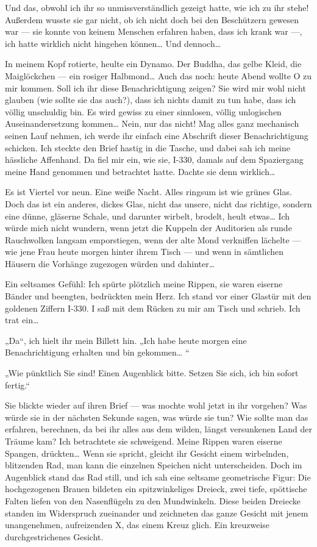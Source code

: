 Und das, obwohl ich ihr so unmissverständlich gezeigt hatte, wie
ich zu ihr stehe! Außerdem wusste sie gar nicht, ob ich nicht doch
bei den Beschützern gewesen war — sie konnte von keinem Menschen
erfahren haben, dass ich krank war —, ich hatte wirklich nicht
hingehen können\ldots{} Und dennoch\ldots{}

In meinem Kopf rotierte, heulte ein Dynamo. Der Buddha, das gelbe
Kleid, die Maiglöckchen — ein rosiger Halbmond\ldots{} Auch das noch:
heute Abend wollte O zu mir kommen. Soll ich ihr diese
Benachrichtigung zeigen? Sie wird mir wohl nicht glauben (wie
sollte sie das auch?), dass ich nichts damit zu tun habe, dass ich
völlig unschuldig bin. Es wird gewiss zu einer sinnlosen, völlig
unlogischen Auseinandersetzung kommen\ldots{} Nein, nur
das nicht! Mag alles ganz mechanisch seinen Lauf nehmen, ich werde
ihr einfach eine Abschrift dieser Benachrichtigung schicken.
Ich steckte den Brief hastig in die Tasche, und dabei sah ich meine
hässliche Affenhand. Da fiel mir ein, wie sie, I-330, damals auf
dem Spaziergang meine Hand genommen und betrachtet hatte. Dachte
sie denn wirklich\ldots{} 

Es ist Viertel vor neun. Eine weiße Nacht.
Alles ringsum ist wie grünes Glas. Doch das ist ein anderes, dickes
Glas, nicht das unsere, nicht das richtige, sondern eine dünne,
gläserne Schale, und darunter wirbelt, brodelt, heult etwas\ldots{} Ich
würde mich nicht wundern, wenn jetzt die Kuppeln der Auditorien als
runde Rauchwolken langsam emporstiegen, wenn der alte Mond
verkniffen lächelte — wie jene Frau heute morgen hinter ihrem Tisch
— und wenn in sämtlichen Häusern die Vorhänge zugezogen würden und
dahinter\ldots{}

Ein seltsames Gefühl: Ich spürte plötzlich meine Rippen, sie waren
eiserne Bänder und beengten, bedrückten mein Herz. Ich stand vor
einer Glastür mit den goldenen Ziffern I-330. I saß mit dem Rücken
zu mir am Tisch und schrieb. Ich trat ein\ldots{}

„Da“, ich hielt ihr mein Billett hin. „Ich habe heute morgen eine
Benachrichtigung erhalten und bin gekommen\ldots{} “

„Wie pünktlich Sie sind! Einen Augenblick bitte. Setzen Sie sich,
ich bin sofort fertig.“

Sie blickte wieder auf ihren Brief — was mochte wohl jetzt in ihr
vorgehen? Was würde sie in der nächsten Sekunde sagen, was würde
sie tun? Wie sollte man das erfahren, berechnen, da bei ihr alles
aus dem wilden, längst versunkenen Land der Träume kam? Ich
betrachtete sie schweigend. Meine Rippen waren eiserne Spangen,
drückten\ldots{} Wenn sie spricht, gleicht ihr Gesicht einem wirbelnden,
blitzenden Rad, man kann die einzelnen Speichen nicht
unterscheiden. Doch im Augenblick stand das Rad still, und ich sah
eine seltsame geometrische Figur: Die hochgezogenen Brauen bildeten
ein spitzwinkeliges Dreieck, zwei tiefe, spöttische Falten liefen
von den Nasenflügeln zu den Mundwinkeln. Diese beiden Dreiecke
standen im Widerspruch zueinander und zeichneten das ganze Gesicht
mit jenem unangenehmen, aufreizenden X, das einem Kreuz glich. Ein
kreuzweise durchgestrichenes Gesicht.

